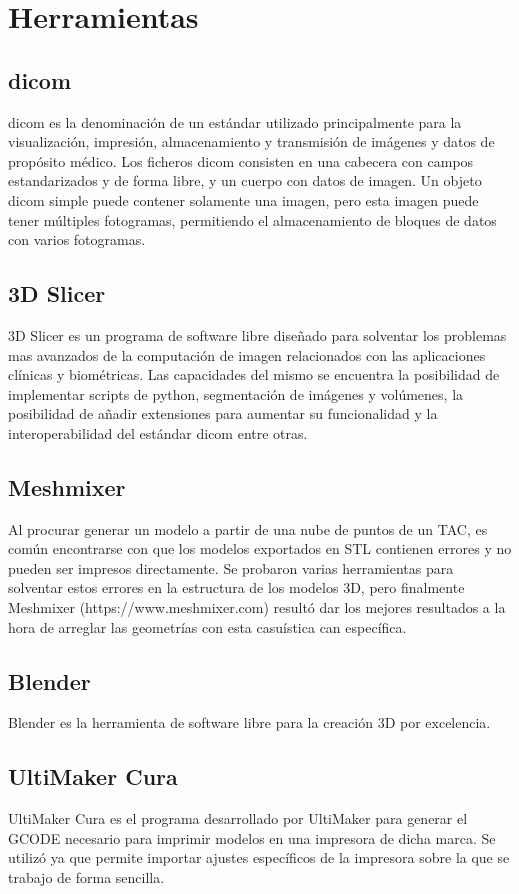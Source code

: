 \section{Herramientas}
    \subsection{\acrfull{dicom}}
    \acrshort{dicom} es la denominación de un estándar utilizado principalmente para la visualización, impresión, almacenamiento y transmisión de imágenes y datos de propósito médico.
    Los ficheros \acrshort{dicom} consisten en una cabecera con campos estandarizados y de forma libre, y un cuerpo con datos de imagen. Un objeto \acrshort{dicom} simple puede contener solamente una imagen, pero esta imagen puede tener múltiples fotogramas, permitiendo el almacenamiento de bloques de datos con varios fotogramas.
   
    \subsection{3D Slicer}
3D Slicer es un programa de software libre diseñado para solventar los problemas mas avanzados de la computación de imagen relacionados con las aplicaciones clínicas y biométricas. Las capacidades del mismo se encuentra la  posibilidad de implementar scripts de python, segmentación de imágenes y volúmenes, la posibilidad de añadir extensiones para aumentar su funcionalidad y la interoperabilidad del estándar \acrshort{dicom} entre otras.

\subsection{Meshmixer}
Al procurar generar un modelo a partir de una nube de puntos de un TAC, es común encontrarse con que los modelos exportados en STL contienen errores y no pueden ser impresos directamente. Se probaron varias herramientas para solventar estos errores en la estructura de los modelos 3D, pero finalmente Meshmixer (https://www.meshmixer.com) resultó dar los mejores resultados a la hora de arreglar las geometrías con esta casuística can específica.
    \subsection{Blender}
Blender es la herramienta de software libre para la creación 3D por excelencia.
    \subsection{UltiMaker Cura}
UltiMaker Cura es el programa desarrollado por UltiMaker para generar el GCODE necesario para imprimir modelos en una impresora de dicha marca. Se utilizó ya que permite importar ajustes específicos de la impresora sobre la que se trabajo de forma sencilla.
